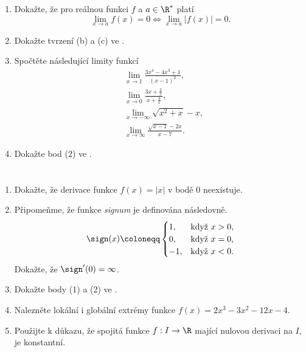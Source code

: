 \begin{enumerate}
 \item Dokažte, že pro reálnou funkci $f$ a $a \in \R^{*}$ platí
  \[
   \lim_{x \to a} f(x) = 0 \Leftrightarrow \lim_{x \to a} |f(x)| = 0.
  \]
 \item Dokažte tvrzení (b) a (c) ve .
 \item Spočtěte následující limity funkcí
  \begin{align*}
   &\lim_{x \to 1} \frac{3x^{4} - 4x^3 + 1}{(x-1)^2},\\
   &\lim_{x \to 0} \frac{3x + \frac{2}{x}}{x + \frac{4}{x}},\\
   &\lim_{x \to -\infty} \sqrt{x^2 + x} - x,\\
   &\lim_{x \to \infty} \frac{\sqrt{x-1}-2x}{x-7}.
  \end{align*}
 \item Dokažte bod (2) ve .
\end{enumerate}

\section*{}
\begin{enumerate}
 \item Dokažte, že derivace funkce $f(x) = |x|$ v bodě $0$ neexistuje.
 \item Připomeňme, že funkce \emph{signum} je definována následovně.
  \[
   \sign(x) \coloneqq \begin{cases}
    1,& \text{když } x > 0,\\
    0,& \text{když } x = 0,\\
    -1,& \text{když } x < 0.
   \end{cases}
  \]
  Dokažte, že $\sign'(0) = \infty$.
 \item Dokažte body (1) a (2) ve .
 \item Nalezněte lokální i globální extrémy funkce $f(x) = 2 x^{3} - 3 x^{2} - 12 x -
  4$.
 \item Použijte  k důkazu, že
  spojitá funkce $f:I \to \R$ mající nulovou derivaci na $I$, je konstantní.
\end{enumerate}
